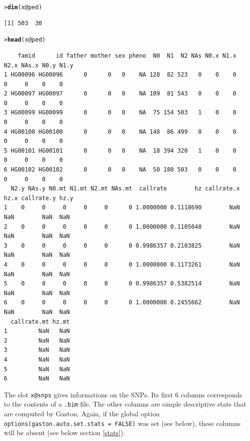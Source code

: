 \documentclass{article}\usepackage[]{graphicx}\usepackage[]{color}
\makeatletter
\newcommand{\hlopt}[1]{\textcolor[rgb]{0,0,0}{#1}}%
\newcommand{\hlstd}[1]{\textcolor[rgb]{0.345,0.345,0.345}{#1}}%
\newcommand{\hlkwc}[1]{\textcolor[rgb]{0.333,0.667,0.333}{#1}}%
\newcommand{\hlkwd}[1]{\textcolor[rgb]{0.737,0.353,0.396}{\textbf{#1}}}%
\newenvironment{kframe}{%
 \def\at@end@of@kframe{}%
 \ifinner\ifhmode%
  \def\at@end@of@kframe{\end{minipage}}%
  \begin{minipage}{\columnwidth}%
 \fi\fi%
 \def\FrameCommand##1{\hskip\@totalleftmargin \hskip-\fboxsep
 \colorbox{shadecolor}{##1}\hskip-\fboxsep
     \hskip-\linewidth \hskip-\@totalleftmargin \hskip\columnwidth}%
 \MakeFramed {\advance\hsize-\width
   \@totalleftmargin\z@ \linewidth\hsize
   \@setminipage}}%
 {\par\unskip\endMakeFramed%
 \at@end@of@kframe}
\newenvironment{knitrout}{}{} %
\makeatother
\begin{document}
\begin{knitrout}
\color{fgcolor}\begin{kframe}
\begin{alltt}
\hlstd{> }\hlkwd{dim}\hlstd{(x}\hlopt{@}\hlkwc{ped}\hlstd{)}
\end{alltt}
\begin{verbatim}
[1] 503  30
\end{verbatim}
\begin{alltt}
\hlstd{> }\hlkwd{head}\hlstd{(x}\hlopt{@}\hlkwc{ped}\hlstd{)}
\end{alltt}
\begin{verbatim}
    famid      id father mother sex pheno  N0  N1  N2 NAs N0.x N1.x N2.x NAs.x N0.y N1.y
1 HG00096 HG00096      0      0   0    NA 128  82 523   0    0    0    0     0    0    0
2 HG00097 HG00097      0      0   0    NA 109  81 543   0    0    0    0     0    0    0
3 HG00099 HG00099      0      0   0    NA  75 154 503   1    0    0    0     0    0    0
4 HG00100 HG00100      0      0   0    NA 148  86 499   0    0    0    0     0    0    0
5 HG00101 HG00101      0      0   0    NA  18 394 320   1    0    0    0     0    0    0
6 HG00102 HG00102      0      0   0    NA  50 180 503   0    0    0    0     0    0    0
  N2.y NAs.y N0.mt N1.mt N2.mt NAs.mt  callrate        hz callrate.x hz.x callrate.y hz.y
1    0     0     0     0     0      0 1.0000000 0.1118690        NaN  NaN        NaN  NaN
2    0     0     0     0     0      0 1.0000000 0.1105048        NaN  NaN        NaN  NaN
3    0     0     0     0     0      0 0.9986357 0.2103825        NaN  NaN        NaN  NaN
4    0     0     0     0     0      0 1.0000000 0.1173261        NaN  NaN        NaN  NaN
5    0     0     0     0     0      0 0.9986357 0.5382514        NaN  NaN        NaN  NaN
6    0     0     0     0     0      0 1.0000000 0.2455662        NaN  NaN        NaN  NaN
  callrate.mt hz.mt
1         NaN   NaN
2         NaN   NaN
3         NaN   NaN
4         NaN   NaN
5         NaN   NaN
6         NaN   NaN
\end{verbatim}
\end{kframe}
\end{knitrout}

  The slot \verb!x@snps! gives informations on the SNPs. Its first 6
  columns corresponds to the contents of a \verb!.bim! file. The other
  columns are simple descriptive stats that are computed by Gaston. Again, if 
  the global option 
  \verb!options(gaston.auto.set.stats = FALSE)! was set (see below), these
  columns will be absent (see below section \ref{stats}).
\end{document}
